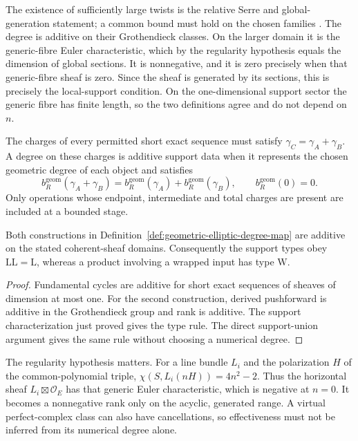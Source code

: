 The existence of sufficiently large twists is the relative Serre
and global-generation statement; a common bound must hold on the
chosen families \cite[Tags~0B5S and~01PR]{StacksProject}. The degree
is additive on their Grothendieck classes. On the larger domain it
is the generic-fibre Euler characteristic, which by the regularity
hypothesis equals the dimension of global sections. It is
nonnegative, and it is zero precisely when that generic-fibre sheaf
is zero. Since the sheaf is generated by its sections, this is
precisely the local-support condition. On the one-dimensional
support sector the generic fibre has finite length, so the two
definitions agree and do not depend on $n$.

\begin{definition}
\label{def:geometric-elliptic-degree-additivity-datum}
The charges of every permitted short exact sequence must satisfy
$\gamma_C=\gamma_A+\gamma_B$. A degree on these charges is
additive support data when it represents the chosen geometric
degree of each object and satisfies
\[
 b_R^{\mathrm{geom}}(\gamma_A+\gamma_B)
 =b_R^{\mathrm{geom}}(\gamma_A)+b_R^{\mathrm{geom}}(\gamma_B),
 \qquad b_R^{\mathrm{geom}}(0)=0.
\]
Only operations whose endpoint, intermediate and total charges are
present are included at a bounded stage.
\end{definition}

\begin{proposition}
\label{prop:geometric-elliptic-degree-additivity-criterion}
Both constructions in Definition~\ref{def:geometric-elliptic-degree-map}
are additive on the stated coherent-sheaf domains. Consequently the
support types obey
$\mathrm L\mathrm L=\mathrm L$, whereas a product involving a
wrapped input has type $\mathrm W$.
\end{proposition}

\begin{proof}
Fundamental cycles are additive for short exact sequences of
sheaves of dimension at most one. For the second construction,
derived pushforward is additive in the Grothendieck group and rank
is additive. The support characterization just proved gives the
type rule. The direct support-union argument gives the same rule
without choosing a numerical degree.
\end{proof}

The regularity hypothesis matters. For a line bundle $L_i$ and
the polarization $H$ of the common-polynomial triple,
$\chi(S,L_i(nH))=4n^2-2$. Thus the horizontal sheaf
$L_i\boxtimes\mathcal O_E$ has that generic Euler characteristic,
which is negative at $n=0$. It becomes a nonnegative rank only on
the acyclic, generated range. A virtual perfect-complex class can
also have cancellations, so effectiveness must not be inferred
from its numerical degree alone.

